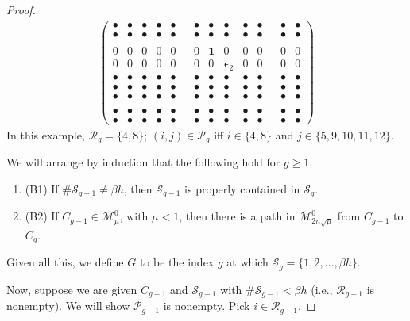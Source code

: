 \documentclass{amsart}
\theoremstyle{definition}
\theoremstyle{remark}
\numberwithin{equation}{section}
\begin{document}
{{\begin{proof}
\begin{align*}
\begin{pmatrix}
{\bullet} &{\bullet} &{\bullet} &{\bullet} &{\bullet}   && {\bullet} &{\bullet} &{\bullet} &{\bullet} &{\bullet} && {\bullet} &{\bullet}  \\ 
{\bullet} &{\bullet} &{\bullet} &{\bullet} &{\bullet} && {\bullet} &{\bullet} &{\bullet} &{\bullet} &{\bullet} && {\bullet} &{\bullet}  \\ 
 & & & & & & & & & & &  & & \\
0&0&0&0&0&  & 0&\mathbf 1 &0&0&0            & &0&0 \\
0&0&0&0&0&  & 0&0&\boldsymbol\epsilon_2   &0&0& &0&0 \\ 
{\bullet} &{\bullet} &{\bullet} &{\bullet} &{\bullet} &  & {\bullet} &{\bullet} &{\bullet} &{\bullet}   &{\bullet} & &{\bullet} &{\bullet}  \\ 
{\bullet} &{\bullet} &{\bullet} &{\bullet} &{\bullet} &  & {\bullet} &{\bullet} &{\bullet} &{\bullet} &{\bullet}   & &{\bullet} &{\bullet}  \\ 
{\bullet} &{\bullet} &{\bullet} &{\bullet} &{\bullet} &  & {\bullet} &{\bullet} &{\bullet} &{\bullet} &{\bullet}                      & &{\bullet} &{\bullet}  \\ 
 & & & & & & & & & & &  & & \\
{\bullet} &{\bullet} &{\bullet} &{\bullet} &{\bullet} && {\bullet} &{\bullet} &{\bullet} &{\bullet} &{\bullet} && {\bullet} &{\bullet}  \\ 
{\bullet} &{\bullet} &{\bullet} &{\bullet} &{\bullet} && {\bullet} &{\bullet} &{\bullet} &{\bullet} &{\bullet} && {\bullet} &{\bullet}  
\end{pmatrix} 
\end{align*} 
In this example, 
$\mathcal R_{g}=\{4,8\}$; 
$(i,j)\in \mathcal P_{g}$ iff 
$i\in \{4,8\}$ and 
$j\in \{5,9,10,11,12\}$.

We will arrange by induction that the 
following hold for $g\geq 1$.  
\begin{enumerate} 
\item[] (B1) 
If $\# \mathcal S_{g-1}\neq \beta h$, then $\mathcal S_{g-1}$
is properly contained in  $\mathcal S_{g}$. 
\item[] (B2)  
If  $C_{g-1}\in \mathcal M^0_{\mu}$, 
with $\mu <1$, 
then there is a path 
 in $\mathcal M^0_{2n\sqrt{ \mu}}$
from $C_{g-1}$ to 
$C_{g}$.  
\end{enumerate} 
Given all this, we  define 
 $G$ to be the index $g$ at which $\mathcal S_g=
\{1,2,\dots , \beta h\}$.  

Now, suppose we are given $C_{g-1}$
 and $\mathcal S_{g-1}$ with 
$\#\mathcal S_{g-1} < \beta h$ 
(i.e.,  $\mathcal R_{g-1}$ is nonempty). 
We will show  $\mathcal P_{g-1}$ is 
nonempty. 
Pick $i\in \mathcal R_{g-1}$. 


\end{proof}}}
\end{document}
